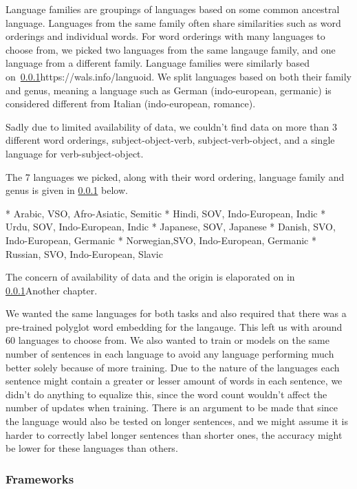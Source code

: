 Language families are groupings of languages based on some common ancestral
language. Languages from the same family often share similarities such as word
orderings and individual words. For word orderings with many languages to choose
from, we picked two languages from the same langauge family, and one language
from a different family. Language families were similarly based
on~\ref{}{https://wals.info/languoid}. We split languages based on both their
family and genus, meaning a language such as German (indo-european, germanic) is
considered different from Italian (indo-european, romance).

Sadly due to limited availability of data, we couldn't find data on more than 3
different word orderings, subject-object-verb, subject-verb-object, and a single
language for verb-subject-object. 

The 7 languages we picked, along with their word ordering, language family and
genus is given in \ref{} below.

* Arabic,   VSO, Afro-Asiatic, Semitic 
* Hindi,    SOV, Indo-European, Indic
* Urdu,     SOV, Indo-European, Indic
* Japanese, SOV, Japanese
* Danish,   SVO, Indo-European, Germanic
* Norwegian,SVO, Indo-European, Germanic
* Russian,  SVO, Indo-European, Slavic

The concern of availability of data and the origin is elaporated on in
\ref{}{Another chapter}.


We wanted the same languages for both tasks and also required that there was a
pre-trained polyglot word embedding for the langauge. This left us with around
60 languages to choose from. We also wanted to train or models on the same
number of sentences in each language to avoid any language performing much
better solely because of more training. Due to the nature of the languages each
sentence might contain a greater or lesser amount of words in each sentence, we
didn't do anything to equalize this, since the word count wouldn't affect the
number of updates when training. There is an argument to be made that since the
language would also be tested on longer sentences, and we might assume it is
harder to correctly label longer sentences than shorter ones, the accuracy might
be lower for these languages than others. 



\subsubsection{Frameworks}

